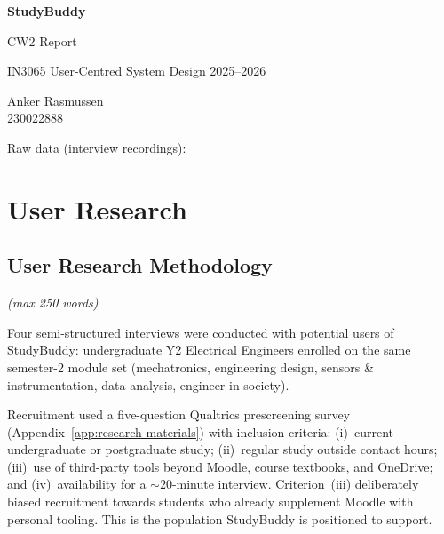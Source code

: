 \documentclass[a4paper,11pt]{article}
\newcommand{\wclimit}[1]{\hfill\textit{\footnotesize(max #1 words)}}
\newcommand{\MYhref}[3][blue]{\href{#2}{\color{#1}{#3}}}%
\begin{document}
\begin{center}
    \vspace*{3cm}
    {\LARGE\bfseries StudyBuddy\par}
    \vspace{0.4cm}
    {\Large CW2 Report\par}
    \vspace{1.5cm}
    {\large IN3065 User-Centred System Design 2025--2026\par}
    \vspace{1cm}
    {\large Anker Rasmussen \\230022888\par}
    \vspace{1.5cm}
    {\normalsize Raw data (interview recordings):
    \MYhref{https://cityuni-my.sharepoint.com/:f:/g/personal/anker_rasmussen_city_ac_uk/IgDGVR9azIIOTK3t1XU7LSTyAUYfGKY0C_x_EShOPKYeH2k?e=O9kAHL}{OneDrive folder (City login required)}\par}
    \vfill
\end{center}
\newpage
\tableofcontents
\vspace{2cm}

\newpage
\section{User Research}
\subsection{User Research Methodology}\label{sec:methodology}
\wclimit{250}

Four semi-structured interviews were conducted with potential users
of StudyBuddy: undergraduate Y2 Electrical Engineers enrolled on the
same semester-2 module set (mechatronics, engineering design,
sensors \& instrumentation, data analysis, engineer in society).

Recruitment used a five-question Qualtrics prescreening survey
(Appendix~\ref{app:research-materials}) with inclusion criteria:
(i)~current undergraduate or postgraduate study; (ii)~regular study
outside contact hours; (iii)~use of third-party tools beyond Moodle,
course textbooks, and OneDrive; and (iv)~availability for a
${\sim}20$-minute interview. Criterion~(iii) deliberately biased
recruitment towards students who already supplement Moodle with
personal tooling. This is the population StudyBuddy is positioned to
support.
\end{document}
